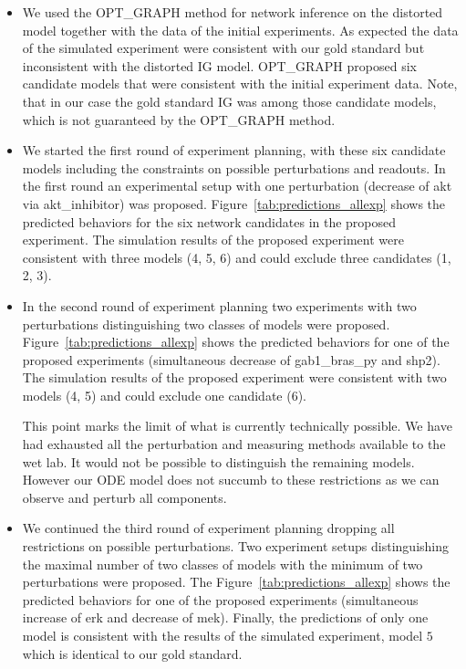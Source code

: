 \begin{itemize}
  \item We used the OPT\_GRAPH method for network inference on the distorted model
together with the data of the initial experiments.
As expected the data of the simulated experiment were consistent with our
gold standard but inconsistent with the distorted IG model.
OPT\_GRAPH proposed six candidate models that were consistent with the initial experiment data.
Note, that in our case the gold standard IG was among those candidate models,
which is not guaranteed by the OPT\_GRAPH method.

  \item We started the first round of experiment planning,
with these six candidate models including the constraints on possible perturbations and
readouts.
In the first round an experimental setup with one perturbation (decrease of {\sffamily akt} via {\sffamily akt\_inhibitor}) was proposed.
Figure~\ref{tab:predictions_allexp} shows the predicted behaviors
for the six network candidates in the proposed experiment.
The simulation results of the proposed experiment were consistent with three
models (4, 5, 6) and could exclude three candidates (1, 2, 3).

  \item In the second round of experiment planning two experiments with two perturbations
distinguishing two classes of models were proposed.
Figure~\ref{tab:predictions_allexp} shows the predicted behaviors for one of
the proposed experiments (simultaneous decrease of {\sffamily gab1\_bras\_py} and {\sffamily shp2}).
The simulation results of the proposed experiment were consistent with two
models (4, 5) and could exclude one candidate (6).

This point marks the limit of what is currently technically possible.
We have had exhausted all the perturbation and measuring methods available to
the wet lab.
It would not be possible to distinguish the remaining models.
However our ODE model does not succumb to these restrictions as we can observe
and perturb all components.

  \item We continued the third round of experiment planning dropping all restrictions
on possible perturbations.
Two experiment setups distinguishing the maximal number of two classes of models
with the minimum of two perturbations were proposed.
The Figure~\ref{tab:predictions_allexp} shows the predicted behaviors for one of
the proposed experiments (simultaneous increase of {\sffamily erk} and decrease of {\sffamily mek}).
Finally, the predictions of only one model is consistent with the results of
the simulated experiment,
model $5$ which is identical to our gold standard.

\end{itemize}

